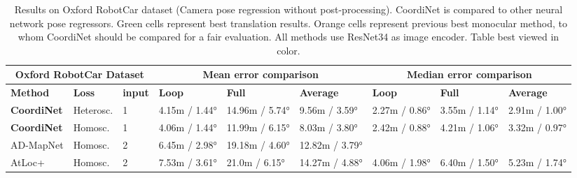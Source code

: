\documentclass[10pt,twocolumn,letterpaper]{article}
\begin{document}
\begin{table*}[!t]
\footnotesize
\centering

\caption{\label{tab:oxford_results}Results on Oxford RobotCar dataset (Camera pose regression without post-processing). CoordiNet is compared to other neural network pose regressors. Green cells represent best translation results. Orange cells represent previous best monocular method, to whom CoordiNet should be compared for a fair evaluation. All methods use ResNet34 as image encoder. Table best viewed in color.}

\vspace{0.4cm}

\begin{tabular}{|l|l|l|l|l|l|l|l|l|}
\hline
\multicolumn{3}{|c|}{\textbf{Oxford RobotCar Dataset}} & \multicolumn{3}{c|}{\textbf{Mean error comparison}}                                                                    & \multicolumn{3}{c|}{\textbf{Median error comparison}}                                                 \\ \hline
\textbf{Method}      & \textbf{Loss}  & \textbf{input}  & \textbf{Loop}                         & \textbf{Full}                         & \textbf{Average}                       & \textbf{Loop}                 & \textbf{Full}                 & \textbf{Average}                      \\ \hline
\textbf{CoordiNet}   & Heterosc.          & 1               & 4.15m / 1.44° & 14.96m / 5.74° & 9.56m / 3.59° & \cellcolor[HTML]{92D050}2.27m / 0.86° & \cellcolor[HTML]{92D050}3.55m / 1.14° & \cellcolor[HTML]{92D050}2.91m / 1.00°         \\ \hline
\textbf{CoordiNet}   & Homosc.            & 1               & \cellcolor[HTML]{92D050}4.06m / 1.44° & \cellcolor[HTML]{92D050}11.99m / 6.15°  & \cellcolor[HTML]{92D050}8.03m / 3.80° & 2.42m / 0.88° & 4.21m / 1.06°                         & 3.32m / 0.97°                                \\ \hline
AD-MapNet            & Homosc.            & 2               & 6.45m / 2.98°                         & 19.18m / 4.60°                        & 12.82m / 3.79°                         &                               &                               &                                       \\ \hline
AtLoc+               & Homosc.            & 2               & 7.53m / 3.61°                         & 21.0m / 6.15°                         & 14.27m / 4.88°                         & 4.06m / 1.98°                 & 6.40m / 1.50°                 & 5.23m / 1.74°                         \\ \hline

\end{tabular}
\end{table*}
\end{document}
